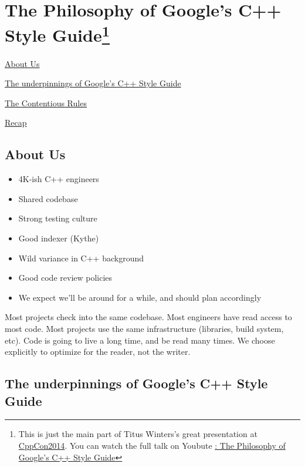 
\chapter{The Philosophy of Google's C++ Style Guide\texorpdfstring{\footnote{This is just the main part of Titus Winters's great presentation at \href{https://github.com/CppCon/CppCon2014/tree/master/Presentations/The Philosophy of Google's C++ Style Guide}{CppCon2014}. You can watch the full talk on Youbute \href{https://www.youtube.com/watch?v=NOCElcMcFik}{: The Philosophy of Google's C++ Style Guide}}}{}}

\begin{introduction}
    \item \hyperref[sec:about-us]{About Us}
    \item \hyperref[sec:the-underpinnings-of-googles-c++-style-guide]{The underpinnings of Google’s C++ Style Guide}
    \item \hyperref[sec:the-contentious-rules]{The Contentious Rules}
    \item \hyperref[sec:recap]{Recap}
\end{introduction}

\section{About Us}\label{sec:about-us}
\begin{itemize}
    \item 4K-ish C++ engineers
    \item Shared codebase
    \item Strong testing culture
    \item Good indexer (Kythe)
    \item Wild variance in C++ background
    \item Good code review policies
    \item We expect we’ll be around for a while, and should plan accordingly
\end{itemize}
Most projects check into the same codebase. Most engineers have read access to most code. Most projects use the same infrastructure (libraries, build system, etc).
Code is going to live a long time, and be read many times. We choose explicitly to optimize for the reader, not the writer.

\section{The underpinnings of Google’s C++ Style Guide}\label{sec:the-underpinnings-of-googles-c++-style-guide}

